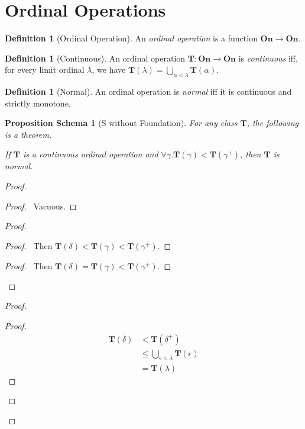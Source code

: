 \documentclass{book}
\let\qed\relax
\newtheorem{props}[ax]{Proposition Schema}
\theoremstyle{definition}
\newtheorem{df}[ax]{Definition}
\begin{document}
\section{Ordinal Operations}

\begin{df}[Ordinal Operation]
An \emph{ordinal operation} is a function $\mathbf{On} \rightarrow \mathbf{On}$.
\end{df}

\begin{df}[Continuous]
An ordinal operation $\mathbf{T} : \mathbf{On} \rightarrow \mathbf{On}$ is \emph{continuous} iff, for every limit ordinal $\lambda$, we have $\mathbf{T}(\lambda) = \bigcup_{\alpha < \lambda} \mathbf{T}(\alpha)$.
\end{df}

\begin{df}[Normal]
An ordinal operation is \emph{normal} iff it is continuous and strictly monotone.
\end{df}

\begin{props}[S without Foundation]
\label{prop:normal}
For any class $\mathbf{T}$, the following is a theorem.

If $\mathbf{T}$ is a continuous ordinal operation and $\forall \gamma. \mathbf{T}(\gamma) < \mathbf{T}(\gamma^+)$, then $\mathbf{T}$ is normal.
\end{props}

\begin{proof}
\pf
{}
\begin{proof}
	\pf\ Vacuous.
\end{proof}
\begin{proof}
	\begin{proof}
		\pf\ Then $\mathbf{T}(\delta) < \mathbf{T}(\gamma) < \mathbf{T}(\gamma^+)$.
	\end{proof}
	\begin{proof}
		\pf\ Then $\mathbf{T}(\delta) = \mathbf{T}(\gamma) < \mathbf{T}(\gamma^+)$.
	\end{proof}
\end{proof}
\begin{proof}
	\begin{proof}
		\pf
		\begin{align*}
			\mathbf{T}(\delta) & < \mathbf{T}(\delta^+) \\
			& \leq \bigcup_{\epsilon < \lambda} \mathbf{T}(\epsilon) \\
			& = \mathbf{T}(\lambda)
		\end{align*}
	\end{proof}
\end{proof}
\qed
\end{proof}
\end{document}
